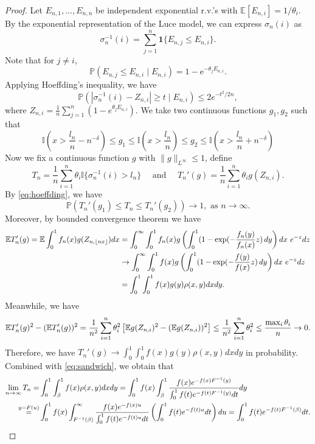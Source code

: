 \documentclass[10pt]{article}
\numberwithin{equation}{section}
\begin{document}
    \begin{proof}
    Let $E_{n,1},\dots,E_{n,n}$ be independent exponential r.v.'s with $\mathbb{E}[E_{n,i}]=1/\theta_{i}$. By the exponential representation of the Luce model, we can express $\sigma_n(i)$ as
    \begin{equation}\label{eq:sigma-expression}
        \sigma^{-1}_n(i)=\sum_{j=1}^n\mathbf{1}\{E_{n,j}\le E_{n,i}\}.
    \end{equation}
    Note that for $j\neq i$,
    \[
    \mathbb{P}(E_{n,j}\le E_{n,i}\mid E_{n,i})=1-\mathrm{e}^{-\theta_{j}E_{n,i}}.
    \]
    Applying Hoeffding's inequality, we have
    \begin{equation}\label{eq:hoeffding}
        \mathbb P(|\sigma^{-1}_n(i)-Z_{n,i}|\ge t\mid E_{n,i})\le 2 e^{-t^2/2n},
    \end{equation}
    where $Z_{n,i}=\frac{1}{n}\sum_{j=1}^n(1-e^{\theta_jE_{n,i}})$. We take two continuous functions $g_1,g_2$ such that
    \[
    \mathbb I(x>\frac{l_n}{n}-n^{-\delta})\le g_1\le \mathbb I(x>\frac{l_n}{n}) \le g_2 \le \mathbb I(x>\frac{l_n}{n}+n^{-\delta})
    \]
    Now we fix a continuous function $g$ with $\|g\|_{L^{\infty}}\leq 1$, define
    \[
    T_n=\frac{1}{n}\sum_{i=1}^{n}\theta_i \mathbb I\{\sigma^{-1}_n(i)>l_n\}\quad \mbox{ and } \quad T_n'(g)=\frac{1}{n}\sum_{i=1}^{n}\theta_i g(Z_{n,i}).
    \]
    By \eqref{eq:hoeffding}, we have
    \begin{equation}\label{eq:sandwich}
        \mathbb P(T_n'(g_1)\leq T_n\leq T_n'(g_2))\to 1, \mbox{ as }n\to \infty.
    \end{equation}
    Moreover, by bounded convergence theorem we have
    \begin{align}
        \mathbb E T_n'(g)=\mathbb E \int_0^1f_n(x) g(Z_{n,\lfloor nx\rfloor})dx
        &=\int_0^\infty\int_0^1 f_n(x) g \left(\int_0^1(1-\exp(-\frac{f_n(y)}{f_n(x)}z)\,dy\right)dx\,\,e^{-z}dz\\
        &\to \int_0^\infty\int_0^1 f(x) g \left(\int_0^1(1-\exp(-\frac{f(y)}{f(x)}z)\,dy\right)dx\,\,e^{-z}dz 
        \\
        &=\int_0^1\int_0^1f(x)g(y)\rho(x,y)dxdy.
    \end{align}
    Meanwhile, we have
    \begin{align}
        \mathbb E T_n'(g)^2-(\mathbb ET_n'(g))^2= \frac{1}{n^2}\sum_{i=1}^n\theta_i^2 \left[\mathbb E g(Z_{n,i})^2-(\mathbb Eg(Z_{n,i}))^2\right]\leq \frac{1}{n^2}\sum_{i=1}^{n}\theta_i^2\leq \frac{\max_i\theta_i}{n}\to 0.
    \end{align}
    Therefore, we have $T_n'(g) \to \int_0^1\int_0^1f(x)g(y)\rho(x,y)dxdy$ in probability. Combined with \eqref{eq:sandwich}, we obtain that
    \begin{align}
        \lim_{n\to \infty} T_n =& \int_0^1\int_\beta^1f(x)\rho(x,y)dxdy 
        = \int_0^1 f(x) \int_\beta^1 \frac{f(x)e^{-f(x)F^{-1}(y)}}{\int_0^1 f(t)e^{-f(t)F^{-1}(y)}dt} dy\\
        \overset{y=F(u)}{=}& \int_0^1 f(x)\int_{F^{-1}(\beta)}^\infty \frac{f(x)e^{-f(x)u}}{\int_0^1 f(t)e^{-f(t)u}dt} \left( \int_0^1 f(t)e^{-f(t)u}dt\right) du
        = \int_0^1f(t)e^{-f(t)F^{-1}(\beta)}dt.
        \qedhere
    \end{align}
\end{proof}
\end{document}
